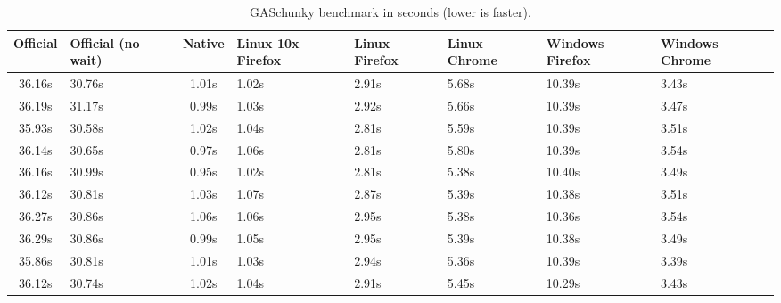 \begin{table}[ht]
  \begin{tabular}{c p{1.5cm} c p{1.7cm} p{1.5cm} p{1.5cm} p{1.5cm} p{1.5cm}}
    \toprule
    Official & Official (no wait) & Native & Linux 10x Firefox & Linux Firefox & Linux Chrome  & Windows Firefox & Windows Chrome\\
    \midrule
    36.16s &             30.76s &  1.01s & 1.02s               & 2.91s         & 5.68s         & 10.39s           & 3.43s          \\
    36.19s &             31.17s &  0.99s & 1.03s               & 2.92s         & 5.66s         & 10.39s           & 3.47s          \\
    35.93s &             30.58s &  1.02s & 1.04s               & 2.81s         & 5.59s         & 10.39s           & 3.51s          \\
    36.14s &             30.65s &  0.97s & 1.06s               & 2.81s         & 5.80s         & 10.39s           & 3.54s          \\
    36.16s &             30.99s &  0.95s & 1.02s               & 2.81s         & 5.38s         & 10.40s           & 3.49s          \\
    36.12s &             30.81s &  1.03s & 1.07s               & 2.87s         & 5.39s         & 10.38s           & 3.51s          \\
    36.27s &             30.86s &  1.06s & 1.06s               & 2.95s         & 5.38s         & 10.36s           & 3.54s          \\
    36.29s &             30.86s &  0.99s & 1.05s               & 2.95s         & 5.39s         & 10.38s           & 3.49s          \\
    35.86s &             30.81s &  1.01s & 1.03s               & 2.94s         & 5.36s         & 10.39s           & 3.39s          \\
    36.12s &             30.74s &  1.02s & 1.04s               & 2.91s         & 5.45s         & 10.29s           & 3.43s          \\
    \bottomrule
  \end{tabular}
  \caption{GASchunky benchmark in seconds (lower is faster).}%
  \label{table:gaschunky}
\end{table}

